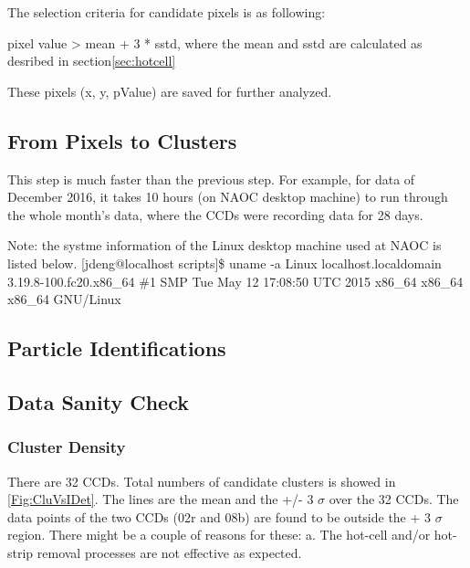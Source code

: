 \documentclass[12pt,twoside,letterpaper]{article}
\begin{document}
The selection criteria for candidate pixels is as following: 
 
 pixel value > mean + 3 * sstd, where the mean and sstd are calculated
 as desribed in section\ref{sec:hotcell}

These pixels (x, y, pValue) are saved for further analyzed.  





\subsection{From Pixels to Clusters} 

This step is much faster than the previous step. For example, for data
of December 2016, it takes 10 hours (on NAOC desktop machine) to run through the whole month's
data, where the CCDs were recording data for 28 days. 

Note: the systme information of the Linux desktop machine used at NAOC is listed below.
[jdeng@localhost scripts]\$ uname -a
Linux localhost.localdomain 3.19.8-100.fc20.x86\_64 \#1 SMP Tue May 12 17:08:50 UTC 2015 x86\_64 x86\_64 x86\_64 GNU/Linux

\subsection{Particle Identifications} 

\subsection{Data Sanity Check} 

\subsubsection{Cluster Density} 
There are 32 CCDs. Total numbers of candidate
clusters is showed in \ref{Fig:CluVsIDet}. The lines are the
mean and the +/- 3 $\sigma$ over the 32 CCDs. The data points of the two CCDs 
(02r and 08b)
are found to be outside the + 3 $\sigma$ region. 
There might be a couple of reasons for these: 
a. The hot-cell and/or hot-strip removal processes are not effective as expected. 
\end{document}
